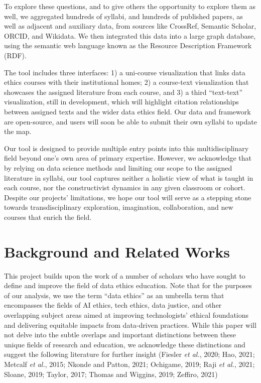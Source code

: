 \documentclass[
]{article}
\begin{document}
To explore these questions, and to give others the opportunity to
explore them as well, we aggregated hundreds of syllabi, and hundreds of
published papers, as well as adjacent and auxiliary data, from sources
like CrossRef, Semantic Scholar, ORCID, and Wikidata. We then integrated
this data into a large graph database, using the semantic web language
known as the Resource Description Framework (RDF).

The tool includes three interfaces: 1) a uni-course visualization that
links data ethics courses with their institutional homes; 2) a
course-text visualization that showcases the assigned literature from
each course, and 3) a third ``text-text'' visualization, still in
development, which will highlight citation relationships between
assigned texts and the wider data ethics field. Our data and framework
are open-source, and users will soon be able to submit their own syllabi
to update the map.

Our tool is designed to provide multiple entry points into this
multidisciplinary field beyond one's own area of primary expertise.
However, we acknowledge that by relying on data science methods and
limiting our scope to the assigned literature in syllabi, our tool
captures neither a holistic view of what is taught in each course, nor
the constructivist dynamics in any given classroom or cohort. Despite
our projects' limitations, we hope our tool will serve as a stepping
stone towards transdisciplinary exploration, imagination, collaboration,
and new courses that enrich the field.

\hypertarget{background-and-related-works}{%
\section{Background and Related
Works}\label{background-and-related-works}}

This project builds upon the work of a number of scholars who have
sought to define and improve the field of data ethics education. Note
that for the purposes of our analysis, we use the term ``data ethics''
as an umbrella term that encompasses the fields of AI ethics, tech
ethics, data justice, and other overlapping subject areas aimed at
improving technologists' ethical foundations and delivering equitable
impacts from data-driven practices. While this paper will not delve into
the subtle overlaps and important distinctions between these unique
fields of research and education, we acknowledge these distinctions and
suggest the following literature for further insight (Fiesler \emph{et
al.}, 2020; Hao, 2021; Metcalf \emph{et al.}, 2015; Nkonde and Patton,
2021; Ochigame, 2019; Raji \emph{et al.}, 2021; Sloane, 2019; Taylor,
2017; Thomas and Wiggins, 2019; Zeffiro, 2021)
\end{document}
